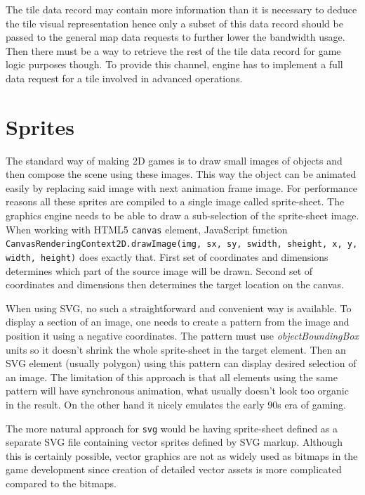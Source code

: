\documentclass[11pt,oneside, final]{fithesis2}
\begin{document}
The tile data record may contain more information than it is necessary to deduce the tile visual representation hence only a subset of this data record should be passed to the general map data requests to further lower the bandwidth usage. Then there must be a way to retrieve the rest of the tile data record for game logic purposes though. To provide this channel, engine has to implement a full data request for a tile involved in advanced operations.

\section{Sprites}
The standard way of making 2D games is to draw small images of objects and then compose the scene using these images. This way the object can be animated easily by replacing said image with next animation frame image. For performance reasons all these sprites are compiled to a single image called sprite-sheet.\cite{pagella} The graphics engine needs to be able to draw a sub-selection of the sprite-sheet image. When working with HTML5 \texttt{canvas} element, JavaScript function \texttt{CanvasRenderingContext2D.drawImage(img, sx, sy, swidth, sheight, x, y, width, height)} does exactly that\cite{canvasdrawimage}. First set of coordinates and dimensions determines which part of the source image will be drawn. Second set of coordinates and dimensions then determines the target location on the canvas.

When using SVG, no such a straightforward and convenient way is available. To display a section of an image, one needs to create a pattern from the image and position it using a negative coordinates. The pattern must use \emph{objectBoundingBox} units so it doesn't shrink the whole sprite-sheet in the target element. Then an SVG element (usually polygon) using this pattern can display desired selection of an image. The limitation of this approach is that all elements using the same pattern will have synchronous animation, what usually doesn't look too organic in the result. On the other hand it nicely emulates the early 90s era of gaming.

The more natural approach for \texttt{svg} would be having sprite-sheet defined as a separate SVG file containing vector sprites defined by SVG markup. Although this is certainly possible, vector graphics are not as widely used as bitmaps in the game development since creation of detailed vector assets is more complicated compared to the bitmaps.
\end{document}
